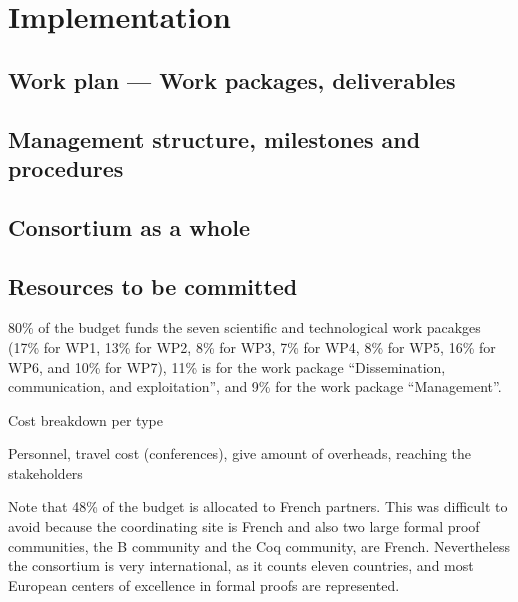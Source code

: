 \chapter{Implementation}\label{chap:implementation}

\section{Work plan --- Work packages, deliverables}



\section{Management structure, milestones and procedures}



\section{Consortium as a whole}\label{sec:consortium}



\section{Resources to be committed}\label{sec:resources}

\wpfigstyle{\scriptsize\setlength{\tabcolsep}{2pt}}
\wpfig%


80\% of the budget funds the seven scientific and technological work
pacakges (17\% for WP1, 13\% for WP2, 8\% for WP3, 7\% for WP4, 8\%
for WP5, 16\% for WP6, and 10\% for WP7), 11\% is for the work package
``Dissemination, communication, and exploitation'', and 9\% for the
work package ``Management''.

{\color{red}
Cost breakdown per type

Personnel, travel cost (conferences), give amount of overheads,
reaching the stakeholders}



Note that 48\% of the budget is allocated to French partners.  This
was difficult to avoid because the coordinating site is French and
also two large formal proof communities, the B community and the Coq
community, are French.  Nevertheless the consortium is very
international, as it counts eleven countries, and most European
centers of excellence in formal proofs are represented.




